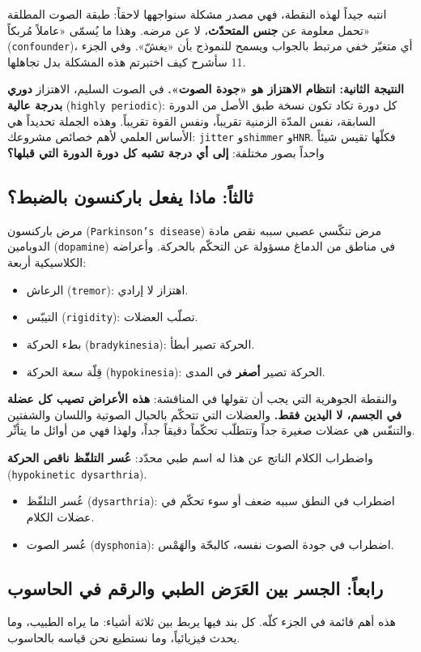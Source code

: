 \documentclass[12pt,a4paper]{report}
\newcommand{\E}[1]{\textenglish{\texttt{#1}}}
\newcommand{\N}[1]{\textenglish{#1}}
\newcommand{\qism}[1]{\subsection*{#1}}
\begin{document}
انتبه جيداً لهذه النقطة، فهي مصدر مشكلة سنواجهها لاحقاً: طبقة الصوت المطلقة
تحمل معلومة عن \textbf{جنس المتحدّث}، لا عن مرضه. وهذا ما يُسمّى «عاملاً
مُربكاً» (\E{confounder})، أي متغيّر خفي مرتبط بالجواب ويسمح للنموذج بأن «يغشّ».
وفي الجزء \N{11} سأشرح كيف اختبرتم هذه المشكلة بدل تجاهلها.

\textbf{النتيجة الثانية: انتظام الاهتزاز هو «جودة الصوت».}
في الصوت السليم، الاهتزاز \textbf{دوري بدرجة عالية} (\E{highly periodic}): كل
دورة تكاد تكون نسخة طبق الأصل من الدورة السابقة، نفس المدّة الزمنية تقريباً،
ونفس القوة تقريباً. وهذه الجملة تحديداً هي الأساس العلمي لأهم خصائص مشروعك:
\E{jitter} و\E{shimmer} و\E{HNR}. فكلّها تقيس شيئاً واحداً بصور مختلفة:
\textbf{إلى أي درجة تشبه كل دورة الدورة التي قبلها؟}

\qism{ثالثاً: ماذا يفعل باركنسون بالضبط؟}

مرض باركنسون (\E{Parkinson's disease}) مرض تنكّسي عصبي سببه نقص مادة الدوبامين
(\E{dopamine}) في مناطق من الدماغ مسؤولة عن التحكّم بالحركة. وأعراضه الكلاسيكية
أربعة:

\begin{itemize}
  \item الرعاش (\E{tremor}): اهتزاز لا إرادي.
  \item التيبّس (\E{rigidity}): تصلّب العضلات.
  \item بطء الحركة (\E{bradykinesia}): الحركة تصير أبطأ.
  \item قِلّة سعة الحركة (\E{hypokinesia}): الحركة تصير \textbf{أصغر} في المدى.
\end{itemize}

والنقطة الجوهرية التي يجب أن تقولها في المناقشة: \textbf{هذه الأعراض تصيب كل
عضلة في الجسم، لا اليدين فقط.} والعضلات التي تتحكّم بالحبال الصوتية واللسان
والشفتين والتنفّس هي عضلات صغيرة جداً وتتطلّب تحكّماً دقيقاً جداً، ولهذا فهي من
أوائل ما يتأثّر.

واضطراب الكلام الناتج عن هذا له اسم طبي محدّد: \textbf{عُسر التلفّظ ناقص الحركة}
(\E{hypokinetic dysarthria}).

\begin{itemize}
  \item عُسر التلفّظ (\E{dysarthria}): اضطراب في النطق سببه ضعف أو سوء تحكّم في
        عضلات الكلام.
  \item عُسر الصوت (\E{dysphonia}): اضطراب في جودة الصوت نفسه، كالبحّة والهَمْس.
\end{itemize}

\qism{رابعاً: الجسر بين العَرَض الطبي والرقم في الحاسوب}

هذه أهم قائمة في الجزء كلّه. كل بند فيها يربط بين ثلاثة أشياء: ما يراه الطبيب،
وما يحدث فيزيائياً، وما نستطيع نحن قياسه بالحاسوب.
\end{document}
